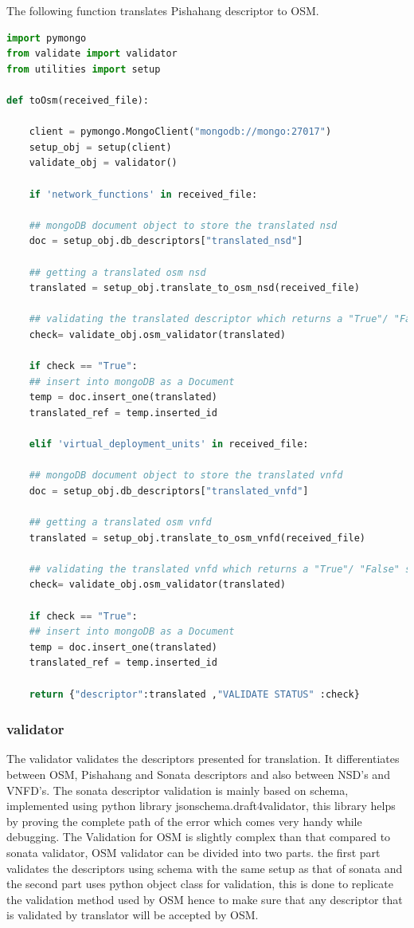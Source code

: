 The following function translates Pishahang descriptor to OSM.
\begin{lstlisting}[language=Python]
import pymongo
from validate import validator
from utilities import setup

def toOsm(received_file):

	client = pymongo.MongoClient("mongodb://mongo:27017")
	setup_obj = setup(client)
	validate_obj = validator()
	
	if 'network_functions' in received_file:
	
	## mongoDB document object to store the translated nsd
	doc = setup_obj.db_descriptors["translated_nsd"]
	
	## getting a translated osm nsd
	translated = setup_obj.translate_to_osm_nsd(received_file)
	
	## validating the translated descriptor which returns a "True"/ "False" string
	check= validate_obj.osm_validator(translated)
	
	if check == "True":
	## insert into mongoDB as a Document
	temp = doc.insert_one(translated)
	translated_ref = temp.inserted_id
	
	elif 'virtual_deployment_units' in received_file:
	
	## mongoDB document object to store the translated vnfd
	doc = setup_obj.db_descriptors["translated_vnfd"]
	
	## getting a translated osm vnfd
	translated = setup_obj.translate_to_osm_vnfd(received_file)
	
	## validating the translated vnfd which returns a "True"/ "False" string
	check= validate_obj.osm_validator(translated)
	
	if check == "True":
	## insert into mongoDB as a Document
	temp = doc.insert_one(translated)
	translated_ref = temp.inserted_id
	
	return {"descriptor":translated ,"VALIDATE STATUS" :check}
\end{lstlisting}

\subsubsection{validator}

The validator validates the descriptors presented for translation. It differentiates between OSM, Pishahang and Sonata descriptors and also between NSD's and VNFD's. The sonata descriptor validation is mainly based on schema, implemented using python library jsonschema.draft4validator, this library helps by proving the complete path of the error which comes very handy while debugging. The Validation for OSM is slightly complex than that compared to sonata validator, OSM validator can be divided into two parts. the first part validates the descriptors using schema with the same setup as that of sonata and the second part uses python object class for validation, this is done to replicate the validation method used by OSM hence to make sure that any descriptor that is validated by translator will be accepted by OSM.

